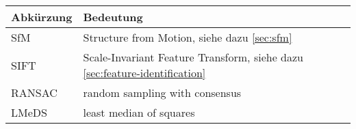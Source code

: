


\begin{table}[h!]
    \begin{tabularx}{\textwidth}{l X}
        \toprule 
        Abkürzung & Bedeutung \\
        \midrule
        SfM & Structure from Motion, siehe dazu \autoref{sec:sfm} \nameref{sec:sfm}\\
        SIFT & Scale-Invariant Feature Transform, siehe dazu \autoref{sec:feature-identification} \nameref{sec:feature-identification}\\
        RANSAC & random sampling with consensus \\
        LMeDS & least median of squares \\
        \bottomrule 
    \end{tabularx}
\end{table}
